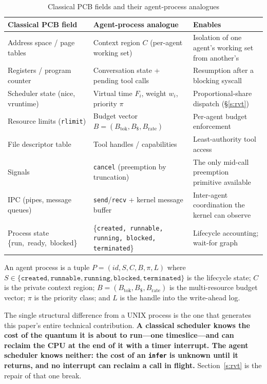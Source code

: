 \documentclass[letterpaper,11pt,leqno]{article}
\begin{document}
\begin{table}[t]
\caption{Classical PCB fields and their agent-process analogues}
\label{t:pcb}
\begin{tabular*}{\textwidth}{p{3.5cm}@{\extracolsep\fill}p{5cm}p{4.5cm}}
\toprule
Classical PCB field & Agent-process analogue & Enables \\
\midrule
Address space / page tables & Context region $C$ (per-agent working set) & Isolation of one agent's working set from another's \\
Registers / program counter & Conversation state + pending tool calls & Resumption after a blocking syscall \\
Scheduler state (nice, vruntime) & Virtual time $F_i$, weight $w_i$, priority $\pi$ & Proportional-share dispatch (\S\ref{s:rvt}) \\
Resource limits (\texttt{rlimit}) & Budget vector $B = (B_{\mathrm{tok}}, B_{\$}, B_{\mathrm{rate}})$ & Per-agent budget enforcement \\
File descriptor table & Tool handles / capabilities & Least-authority tool access \\
Signals & \texttt{cancel} (preemption by truncation) & The only mid-call preemption primitive available \\
IPC (pipes, message queues) & \texttt{send}/\texttt{recv} + kernel message buffer & Inter-agent coordination the kernel can observe \\
Process state \{\hbox{run, ready, blocked}\} & \{\texttt{created, runnable, running, blocked, terminated}\} & Lifecycle accounting; wait-for graph \\
\bottomrule
\end{tabular*}
\end{table}

\begin{definition}\label{d:agent}
An agent process is a tuple $P = (\mathit{id}, S, C, B, \pi, L)$ where $S \in \{\texttt{created}, \texttt{runnable}, \texttt{running}, \texttt{blocked}, \texttt{terminated}\}$ is the lifecycle state; $C$ is the private context region; $B = (B_{\mathrm{tok}}, B_{\$}, B_{\mathrm{rate}})$ is the multi-resource budget vector; $\pi$ is the priority class; and $L$ is the handle into the write-ahead log.
\end{definition}

The single structural difference from a UNIX process is the one that generates this paper's entire technical contribution. \textbf{A classical scheduler knows the cost of the quantum it is about to run---one timeslice---and can reclaim the CPU at the end of it with a timer interrupt. The agent scheduler knows neither: the cost of an \texttt{infer} is unknown until it returns, and no interrupt can reclaim a call in flight.} Section~\ref{s:rvt} is the repair of that one break.
\end{document}

